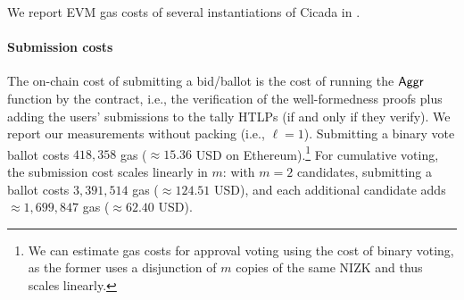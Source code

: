 \begin{table*}[tb!]
    \caption{Gas costs for Cicada cumulative voting and sealed-bid auctions with various numbers of candidates $m$, bid bit-lengths $b$ (max. bid $M = 2^{b-1}$), and packing parameters $\ell$.}
    \label{tab:gas_table}
\end{table*}

We report EVM gas costs of several instantiations of Cicada in . 

\paragraph{Submission costs} 
The on-chain cost of submitting a bid/ballot is the cost of running the $\sf Aggr$ function by the contract, i.e., the verification of the well-formedness proofs plus adding the users' submissions to the tally HTLPs (if and only if they verify). We report our measurements without packing (i.e., $\ell=1$). Submitting a binary vote ballot costs $418,358$ gas ($\approx 15.36$ USD on Ethereum).\footnote{We can estimate gas costs for approval voting using the cost of binary voting, as the former uses a disjunction of $m$ copies of the same NIZK and thus scales linearly.} 
For cumulative voting, the submission cost scales linearly in $m$: with $m=2$ candidates, submitting a ballot costs 
$3,391,514$ gas ($\approx124.51$ USD), 
and each additional candidate adds $\approx 1,699,847$ gas ($\approx 62.40$ USD).

